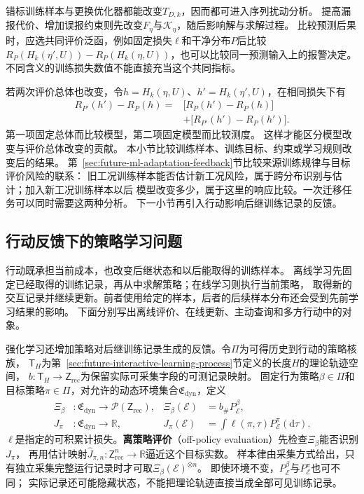 错标训练样本与更换优化器都能改变$T_{D,k}$，因而都可进入序列扰动分析。
提高漏报代价、增加误报约束则先改变$F_\eta$与$\mathcal K_\eta$，随后影响解与求解过程。
比较预测后果时，应选共同评价泛函，例如固定损失$\ell$和干净分布$P$后比较
$R_P(H_k(\eta',U))-R_P(H_k(\eta,U))$，也可以比较同一预测输入上的报警决定。
不同含义的训练损失数值不能直接充当这个共同指标。

若两次评价总体也改变，令$h=H_k(\eta,U)$、$h'=H_k(\eta',U)$，在相同损失下有
\[
  \begin{aligned}
    R_{P'}(h')-R_P(h)
    ={}&\bigl[R_P(h')-R_P(h)\bigr]\\
       &+\bigl[R_{P'}(h')-R_P(h')\bigr].
  \end{aligned}
\]
第一项固定总体而比较模型，第二项固定模型而比较测度。
这样才能区分模型改变与评价总体改变的贡献。
本小节比较训练样本、训练目标、约束或学习规则改变后的结果。
第~\ref{sec:future-ml-adaptation-feedback}节比较来源训练规律与目标评价风险的联系：
旧工况训练样本能否估计新工况风险，属于跨分布识别与估计；加入新工况训练样本以后
模型改变多少，属于这里的响应比较。一次迁移任务可以同时需要这两种分析。
下一小节再引入行动影响后继训练记录的反馈。

\subsection{行动反馈下的策略学习问题}
\label{sec:future-action-feedback-conditions}

行动既承担当前成本，也改变后继状态和以后能取得的训练样本。
离线学习先固定已经取得的训练记录，再从中求解策略；在线学习则执行当前策略，
取得新的交互记录并继续更新。前者使用给定的样本，后者的后续样本分布还会受到先前学习结果的影响。
下面分别写出离线评价、在线更新、主动查询和多方行动中的对象。

强化学习还增加策略对后继训练记录生成的反馈。令$\Pi$为可得历史到行动的策略核族，
$\mathsf T_H$为第~\ref{sec:future-interactive-learning-process}节定义的长度$H$的理论轨迹空间，
$b:\mathsf T_H\to\mathsf Z_{\mathrm{rec}}$为保留实际可采集字段的可测记录映射。
固定行为策略$\beta\in\Pi$和目标策略$\pi\in\Pi$，对允许的动态环境集合$\mathfrak E_{\mathrm{dyn}}$，定义
\begin{equation}
  \begin{aligned}
    \Xi_\beta&:\mathfrak E_{\mathrm{dyn}}\to\mathcal P(\mathsf Z_{\mathrm{rec}}),
      &\Xi_\beta(\mathcal E)&=b_{\#}P_{\mathcal E}^{\beta},\\
    J_\pi&:\mathfrak E_{\mathrm{dyn}}\to\mathbb R,
      &J_\pi(\mathcal E)&=\int\ell(\pi,\tau)P_{\mathcal E}^{\pi}(\mathrm d\tau).
  \end{aligned}
  \label{eq:future-task-off-policy-maps}
\end{equation}
$\ell$是指定的可积累计损失。\textbf{离策略评价}（off-policy evaluation）先检查$\Xi_\beta$能否识别$J_\pi$，
再用估计映射$\widehat J_{\pi,n}:\mathsf Z_{\mathrm{rec}}^n\to\mathbb R$逼近这个目标实数。
样本律由采集方式给出，只有独立采集完整运行记录时才可取$\Xi_\beta(\mathcal E)^{\otimes n}$。
即使环境不变，$P_{\mathcal E}^{\beta}$与$P_{\mathcal E}^{\pi}$也可不同；
实际记录还可能隐藏状态，不能把理论轨迹直接当成全部可见训练记录。


